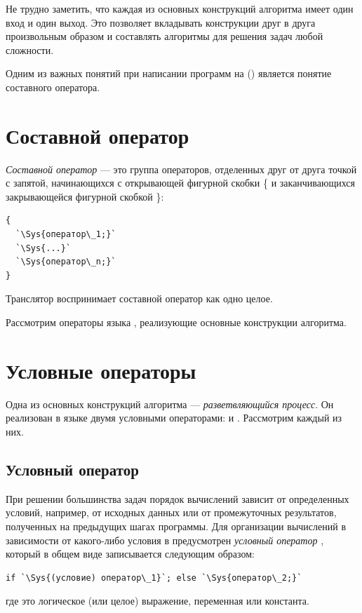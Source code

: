 Не трудно заметить, что каждая из основных конструкций алгоритма имеет один вход и один выход. Это позволяет вкладывать
конструкции друг в друга произвольным образом и составлять алгоритмы для решения задач любой сложности.

Одним из важных понятий при написании программ на () является понятие составного оператора.

\section[Составной оператор]{Составной оператор}
\emph{Составной оператор} --- это группа операторов, отделенных друг от друга
точкой с запятой, начинающихся с открывающей фигурной скобки \{ и заканчивающихся закрывающейся
фигурной скобкой \}:
\begin{lstlisting}
{
  `\Sys{оператор\_1;}`
  `\Sys{...}`
  `\Sys{оператор\_n;}`
}
\end{lstlisting}

Транслятор воспринимает составной оператор как одно целое.

Рассмотрим операторы языка , реализующие основные конструкции алгоритма.

\section[Условные операторы]{Условные операторы}
Одна из основных конструкций алгоритма --- 
\emph{разветвляющийся процесс}. Он реализован в языке
 двумя условными операторами:  и . Рассмотрим каждый из них.

\subsection[Условный оператор]{Условный оператор}
При решении большинства задач порядок вычислений зависит от определенных условий, например, от исходных данных или от
промежуточных результатов, полученных на предыдущих шагах программы. Для организации вычислений в зависимости от
какого-либо условия в  предусмотрен \emph{условный оператор} , 
который в общем виде записывается следующим образом:
\begin{lstlisting}
if `\Sys{(условие) оператор\_1}`; else `\Sys{оператор\_2;}`
\end{lstlisting}
где  это логическое (или целое) выражение, переменная или константа. 

